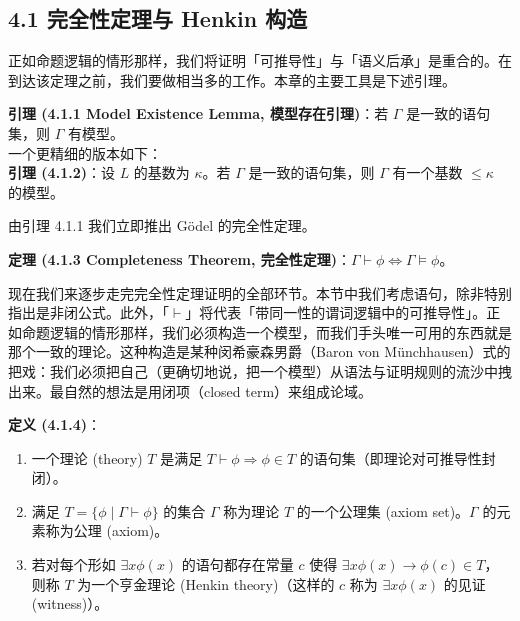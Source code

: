 \documentclass[12pt, a4paper]{article}
\begin{document}
\subsection*{4.1 完全性定理与 Henkin 构造}

正如命题逻辑的情形那样，我们将证明「可推导性」与「语义后承」是重合的。在到达该定理之前，我们要做相当多的工作。本章的主要工具是下述引理。

\begin{mdframed}
\textbf{引理 (4.1.1 Model Existence Lemma, 模型存在引理)}：若 \(\Gamma\) 是一致的语句集，则 \(\Gamma\) 有模型。\\
一个更精细的版本如下：\\
\textbf{引理 (4.1.2)}：设 \(L\) 的基数为 \(\kappa\)。若 \(\Gamma\) 是一致的语句集，则 \(\Gamma\) 有一个基数 \(\leq \kappa\) 的模型。
\end{mdframed}

由引理 4.1.1 我们立即推出 Gödel 的完全性定理。

\begin{mdframed}
\textbf{定理 (4.1.3 Completeness Theorem, 完全性定理)}：\(\Gamma \vdash \phi \iff \Gamma \models \phi\)。
\end{mdframed}

现在我们来逐步走完完全性定理证明的全部环节。本节中我们考虑语句，除非特别指出是非闭公式。此外，「\(\vdash\)」将代表「带同一性的谓词逻辑中的可推导性」。正如命题逻辑的情形那样，我们必须构造一个模型，而我们手头唯一可用的东西就是那个一致的理论。这种构造是某种闵希豪森男爵（Baron von Münchhausen）式的把戏：我们必须把自己（更确切地说，把一个模型）从语法与证明规则的流沙中拽出来。最自然的想法是用闭项（closed term）来组成论域。

\begin{mdframed}
\textbf{定义 (4.1.4)}：
\begin{enumerate}
    \item[(i)] 一个理论 (theory) \(T\) 是满足 \(T \vdash \phi \Rightarrow \phi \in T\) 的语句集（即理论对可推导性封闭）。
    \item[(ii)] 满足 \(T = \{\phi \mid \Gamma \vdash \phi\}\) 的集合 \(\Gamma\) 称为理论 \(T\) 的一个公理集 (axiom set)。\(\Gamma\) 的元素称为公理 (axiom)。
    \item[(iii)] 若对每个形如 \(\exists x \phi(x)\) 的语句都存在常量 \(c\) 使得 \(\exists x \phi(x) \to \phi(c) \in T\)，则称 \(T\) 为一个亨金理论 (Henkin theory)（这样的 \(c\) 称为 \(\exists x \phi(x)\) 的见证 (witness)）。
\end{enumerate}
\end{mdframed}
\end{document}
